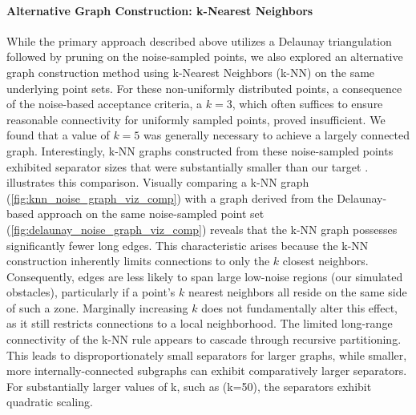\paragraph{Alternative Graph Construction: k-Nearest Neighbors}

While the primary approach described above utilizes a Delaunay triangulation followed by pruning on the noise-sampled points, we also explored an alternative graph construction method using k-Nearest Neighbors (k-NN) on the same underlying point sets.
For these non-uniformly distributed points, a consequence of the noise-based acceptance criteria, a \(k=3\), which often suffices to ensure reasonable connectivity for uniformly sampled points, proved insufficient.
We found that a value of \(k=5\) was generally necessary to achieve a largely connected graph.
Interestingly, k-NN graphs constructed from these noise-sampled points exhibited separator sizes that were substantially smaller than our target .
 illustrates this comparison.
Visually comparing a k-NN graph (\cref{fig:knn_noise_graph_viz_comp}) with a graph derived from the Delaunay-based approach on the same noise-sampled point set (\cref{fig:delaunay_noise_graph_viz_comp}) reveals that the k-NN graph possesses significantly fewer long edges.
This characteristic arises because the k-NN construction inherently limits connections to only the \(k\) closest neighbors.
Consequently, edges are less likely to span large low-noise regions (our simulated obstacles), particularly if a point's \(k\) nearest neighbors all reside on the same side of such a zone.
Marginally increasing \(k\) does not fundamentally alter this effect, as it still restricts connections to a local neighborhood.
The limited long-range connectivity of the k-NN rule appears to cascade through recursive partitioning. This leads to disproportionately small separators for larger graphs, while smaller, more internally-connected subgraphs can exhibit comparatively larger separators.
For substantially larger values of k, such as (k=50), the separators exhibit quadratic scaling.

